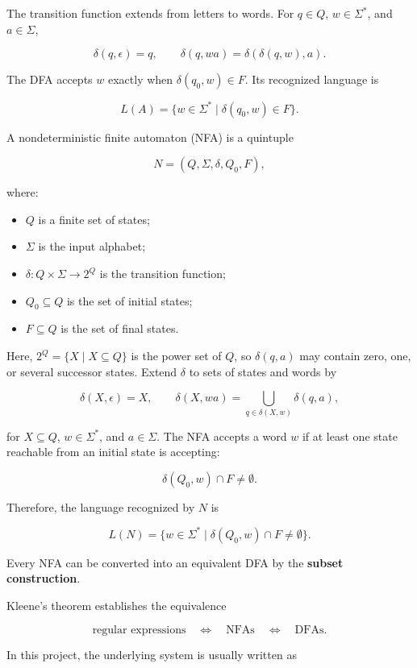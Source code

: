 \documentclass[11pt]{article}
\begin{document}
The transition function extends from letters to words. For $q\in Q$, $w\in\Sigma^*$, and $a\in\Sigma$,

\[
\delta(q,\epsilon)=q,\qquad
\delta(q,wa)=\delta(\delta(q,w),a).
\]

The DFA accepts $w$ exactly when $\delta(q_0,w)\in F$. Its recognized language is

\[
L(A)=\{w\in\Sigma^*\mid\delta(q_0,w)\in F\}.
\]

A nondeterministic finite automaton (NFA) is a quintuple

\[
N=(Q,\Sigma,\delta,Q_0,F),
\]

where:

\begin{itemize}
\item $Q$ is a finite set of states;
\item $\Sigma$ is the input alphabet;
\item $\delta:Q\times\Sigma\rightarrow 2^Q$ is the transition function;
\item $Q_0\subseteq Q$ is the set of initial states;
\item $F\subseteq Q$ is the set of final states.

\end{itemize}

Here, $2^Q=\{X\mid X\subseteq Q\}$ is the power set of $Q$, so $\delta(q,a)$ may contain zero, one, or several successor states. Extend $\delta$ to sets of states and words by

\[
\delta(X,\epsilon)=X,\qquad
\delta(X,wa)=\bigcup_{q\in\delta(X,w)}\delta(q,a),
\]

for $X\subseteq Q$, $w\in\Sigma^*$, and $a\in\Sigma$. The NFA accepts a word $w$ if at least one state reachable from an initial state is accepting:

\[
\delta(Q_0,w)\cap F\neq\emptyset.
\]

Therefore, the language recognized by $N$ is

\[
L(N)=\{w\in\Sigma^*\mid\delta(Q_0,w)\cap F\neq\emptyset\}.
\]

Every NFA can be converted into an equivalent DFA by the \textbf{subset construction}. 

Kleene's theorem establishes the equivalence

\[
\text{regular expressions}
\quad\Longleftrightarrow\quad
\text{NFAs}
\quad\Longleftrightarrow\quad
\text{DFAs}.
\]

In this project, the underlying system is usually written as
\end{document}
